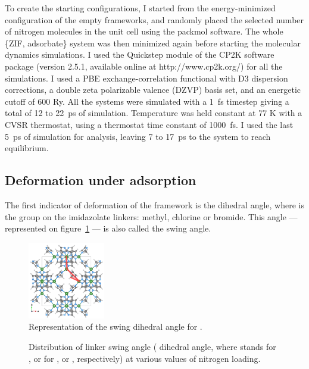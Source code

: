 \documentclass[thesis]{subfiles}
\begin{document}
To create the starting configurations, I started from the energy-minimized
configuration of the empty frameworks, and randomly placed the selected number
of nitrogen molecules in the unit cell using the packmol
software\cite{Martnez2009}.  The whole \{ZIF, adsorbate\} system was then
minimized again before starting the molecular dynamics simulations. I used the
Quickstep module\cite{VandeVondele2005} of the CP2K software package (version
2.5.1, available online at http://www.cp2k.org/) for all the simulations. I used
a PBE exchange-correlation functional with D3 dispersion corrections, a double
zeta polarizable valence (DZVP) basis set, and an energetic cutoff of 600 Ry.
All the systems were simulated with a \SI{1}{fs} timestep giving a total of 12
to \SI{22}{ps} of simulation. Temperature was held constant at 77 K with a CVSR
thermostat, using a thermostat time constant of \SI{1000}{fs}. I used the last
\SI{5}{ps} of simulation for analysis, leaving 7 to \SI{17}{ps} to the system to
reach equilibrium.

\subsection{Deformation under adsorption}

The first indicator of deformation of the framework is the 
dihedral angle, where  is the group on the imidazolate linkers: methyl,
chlorine or bromide. This angle --- represented on
figure~\ref{fig:zif8x:swing-angle} --- is also called the swing angle.

\begin{figure}[ht]
    \centering
    \includegraphics[width=0.3\textwidth]{figures/images/swing-angle}
    \caption{Representation of the swing  dihedral angle for .}
    \label{fig:zif8x:swing-angle}
\end{figure}

\begin{figure}[ht]
    \centering
    
    \caption{Distribution of linker swing angle ( dihedral angle,
    where  stands for ,  or  for , \ZIFCl or
    \ZIFBr, respectively) at various values of nitrogen loading.}
    \label{fig:zif8x:dihedrals}
\end{figure}
\end{document}
